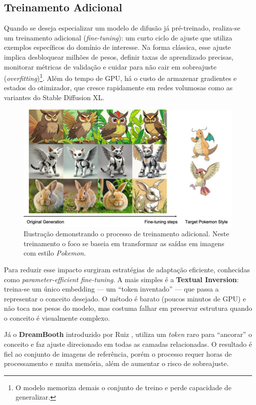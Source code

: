 \documentclass[12pt, %
openright, 
oneside, %
a4paper,    %
brazil]{facom-ufu-abntex2}
\begin{document}
\subsection{Treinamento Adicional}

Quando se deseja especializar um modelo de difusão já pré-treinado, realiza-se um treinamento adicional (\emph{fine-tuning}): um curto ciclo de ajuste que utiliza exemplos específicos do domínio de interesse. Na forma clássica, esse ajuste implica desbloquear milhões de pesos, definir taxas de aprendizado precisas, monitorar métricas de validação e cuidar para não cair em sobreajuste (\textit{overfitting})\footnote{O modelo memoriza demais o conjunto de treino e perde capacidade de generalizar.}. Além do tempo de GPU, há o custo de armazenar gradientes e estados do otimizador, que cresce rapidamente em redes volumosas como as variantes do Stable Diffusion XL.

\begin{figure}[H]
    \centering
    \includegraphics[width=0.9\linewidth]{finetuning-1.png}
    \caption{Ilustração demonstrando o processo de treinamento adicional. Neste treinamento o foco se baseia em transformar as saídas em imagens com estilo \textit{Pokemon}.}
    \label{fig:finetuning1}
\end{figure}

Para reduzir esse impacto surgiram estratégias de adaptação eficiente, conhecidas como \textit{parameter-efficient fine-tuning}. A mais simples é a \textbf{Textual Inversion}: treina-se um único embedding — um ``token inventado'' — que passa a representar o conceito desejado. O método é barato (poucos minutos de GPU) e não toca nos pesos do modelo, mas costuma falhar em preservar estrutura quando o conceito é visualmente complexo.

Já o \textbf{DreamBooth} introduzido por Ruiz \cite{ruiz2023dreamboothfinetuningtexttoimage}, utiliza um \emph{token} raro para ``ancorar'' o conceito e faz ajuste direcionado em todas as camadas relacionadas. O resultado é fiel ao conjunto de imagens de referência, porém o processo requer horas de processamento e muita memória, além de aumentar o risco de sobreajuste.
\end{document}
